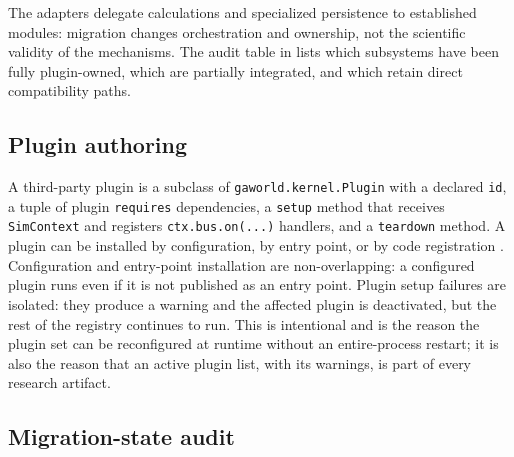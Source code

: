 The adapters delegate calculations and specialized persistence to established
modules: migration changes orchestration and ownership, not the scientific
validity of the mechanisms.  The audit table in
 lists which subsystems have been fully
plugin-owned, which are partially integrated, and which retain direct
compatibility paths.

\subsection{Plugin authoring}
\label{sec:plugin-authoring}

A third-party plugin is a subclass of \texttt{gaworld.kernel.Plugin} with a
declared \texttt{id}, a tuple of plugin \texttt{requires} dependencies, a
\texttt{setup} method that receives \texttt{SimContext} and registers
\texttt{ctx.bus.on(...)} handlers, and a \texttt{teardown} method.  A plugin
can be installed by configuration, by entry point, or by code registration
\citep{gaworldplugin}.  Configuration and entry-point installation are
non-overlapping: a configured plugin runs even if it is not published as an
entry point.  Plugin setup failures are isolated: they produce a warning and
the affected plugin is deactivated, but the rest of the registry continues to
run.  This is intentional and is the reason the plugin set can be
reconfigured at runtime without an entire-process restart; it is also the
reason that an active plugin list, with its warnings, is part of every
research artifact.

\subsection{Migration-state audit}

